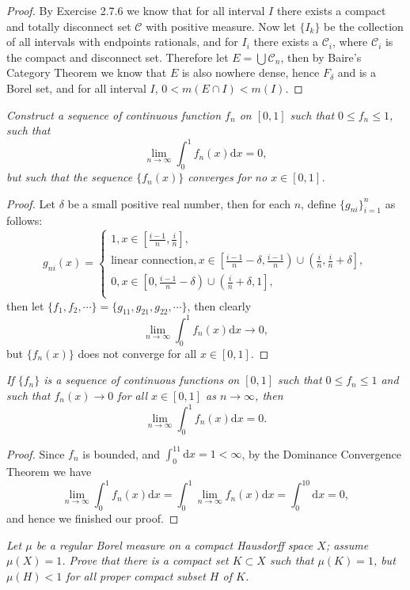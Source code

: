\begin{proof}
By Exercise 2.7.6 we know that for all interval $I$ there exists a compact and totally disconnect set $\mathcal{C}$ with positive measure. Now let $\{I_k\}$ be the collection of all intervals with endpoints rationals, and for $I_i$ there exists a $\mathcal{C}_i$, where $\mathcal{C}_i$ is the compact and disconnect set. Therefore let $E=\bigcup\mathcal{C}_n$, then by Baire's Category Theorem we know that $E$ is also nowhere dense, hence $F_\delta$ and is a Borel set, and for all interval $I$, $0<m(E\cap I)<m(I)$.
\end{proof}
\begin{problem}\em
Construct a sequence of continuous function $f_n$ on $[0,1]$ such that $0\le f_n\le 1$, such that 
$$\lim_{n\to\infty}\int_0^1f_n(x)\mathrm{d}x=0,$$
but such that the sequence $\{f_n(x)\}$ converges for no $x\in[0,1]$.
\end{problem}
\begin{proof}
Let $\delta$ be a small positive real number, then for each $n$, define $\{g_{ni}\}_{i=1}^n$ as follows:
$$
g_{ni}(x)=\begin{cases}
	1,x\in \left[ \frac{i-1}{n},\frac{i}{n} \right] ,\\
	\text{linear connection},x\in \left[ \frac{i-1}{n}-\delta ,\frac{i-1}{n} \right) \cup \left( \frac{i}{n},\frac{i}{n}+\delta \right] ,\\
	0,x\in \left[ 0,\frac{i-1}{n}-\delta \right) \cup \left( \frac{i}{n}+\delta ,1 \right] ,\\
\end{cases}
$$
then let $\{f_1,f_2,\cdots\}=\{g_{11},g_{21},g_{22},\cdots\}$, then clearly 
$$\lim_{n\to\infty}\int_0^1f_n(x)\mathrm{d}x\to 0,$$
but $\{f_n(x)\}$ does not converge for all $x\in[0,1]$.
\end{proof}
\begin{problem}\em
If $\{f_n\}$ is a sequence of continuous functions on $[0,1]$ such that $0\le f_n\le 1$ and such that $f_n(x)\to 0$ for all $x\in[0,1]$ as $n\to\infty$, then 
$$\lim_{n\to\infty}\int_0^1f_n(x)\mathrm{d}x=0.$$
\end{problem}
\begin{proof}
Since $f_n$ is bounded, and $\int_0^11\mathrm{d}x=1<\infty$, by the Dominance Convergence Theorem we have 
$$\lim_{n\to\infty}\int_0^1f_n(x)\mathrm{d}x=\int_0^1\lim_{n\to\infty}f_n(x)\mathrm{d}x=\int_0^10\mathrm{d}x=0,$$
and hence we finished our proof.
\end{proof}
\begin{problem}\em
Let $\mu$ be a regular Borel measure on a compact Hausdorff space $X$; assume $\mu(X)=1$. Prove that there is a compact set $K\subset X$ such that $\mu(K)=1$, but $\mu(H)<1$ for all proper compact subset $H$ of $K$.
\end{problem}
